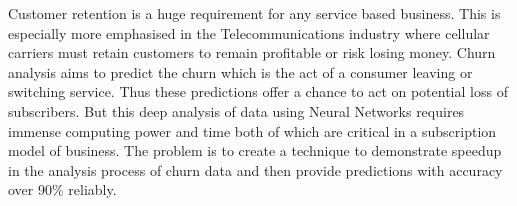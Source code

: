 \hspace{0.9cm} Customer retention is a huge requirement for any service based business. This is especially more emphasised in the Telecommunications industry where cellular carriers must retain customers to remain profitable or risk losing money. Churn analysis aims to predict the churn which is the act of a consumer leaving or switching service. Thus these predictions offer a chance to act on potential loss of subscribers. But this deep analysis of data using Neural Networks requires immense computing power and time both of which are critical in a subscription model of business. The problem is to create a technique to demonstrate speedup in the analysis process of churn data and then provide predictions with accuracy over 90\% reliably.

